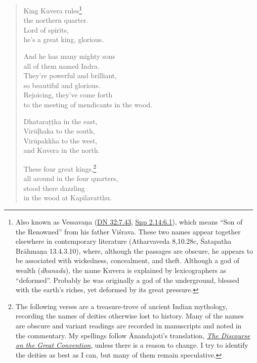 \documentclass[12pt,openany]{book}%
\begin{document}
\begin{verse}
King Kuvera rules\footnote{Also known as \textsanskrit{Vessavaṇa} (\href{https://suttacentral.net/dn32/en/sujato\#7.43}{DN 32:7.43}, \href{https://suttacentral.net/snp2.14/en/sujato\#6.1}{Snp 2.14:6.1}), which means “Son of the Renowned” from his father \textsanskrit{Viśrava}. These two names appear together elsewhere in contemporary literature (Atharvaveda 8,10.28c, Śatapatha \textsanskrit{Brāhmaṇa} 13.4.3.10), where, although the passages are obscure, he appears to be associated with wickedness, concealment, and theft. Although a god of wealth (\textit{dhanada}), the name Kuvera is explained by lexicographers as “deformed”. Probably he was originally a god of the underground, blessed with the earth’s riches, yet deformed by its great pressure. } \\
the northern quarter. \\
Lord of spirits, \\
he’s a great king, glorious. 

And he has many mighty sons \\
all of them named Indra. \\
They’re powerful and brilliant, \\
so beautiful and glorious. \\
Rejoicing, they’ve come forth \\
to the meeting of mendicants in the wood. 

\textsanskrit{Dhataraṭṭha} in the east, \\
\textsanskrit{Virūḷhaka} to the south, \\
\textsanskrit{Virūpakkha} to the west, \\
and Kuvera in the north. 

These four great kings,\footnote{The following verses are a treasure-trove of ancient Indian mythology, recording the names of deities otherwise lost to history. Many of the names are obscure and variant readings are recorded in manuscripts and noted in the commentary. My spellings follow Ānandajoti’s translation, \emph{\href{https://suttacentral.nethttp://www.ancient-buddhist-texts.net/Texts-and-Translations/Safeguard/02x-Atirekani-Sattasuttani-23.htm}{The Discourse on the Great Convention}}, unless there is a reason to change. I try to identify the deities as best as I can, but many of them remain speculative. } \\
all around in the four quarters, \\
stood there dazzling \\
in the wood at Kapilavatthu. 


\end{verse}
\end{document}
